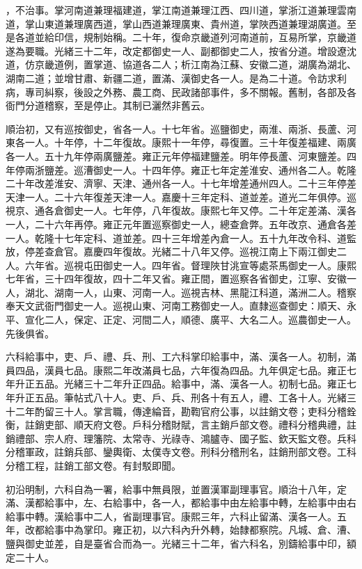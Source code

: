 \begin{pinyinscope}
，不治事。掌河南道兼理福建道，掌江南道兼理江西、四川道，掌浙江道兼理雲南道，掌山東道兼理廣西道，掌山西道兼理廣東、貴州道，掌陜西道兼理湖廣道。至是各道並給印信，規制始稱。二十年，復命京畿道列河南道前，互易所掌，京畿道遂為要職。光緒三十二年，改定都御史一人、副都御史二人，按省分道。增設遼沈道，仿京畿道例，置掌道、協道各二人；析江南為江蘇、安徽二道，湖廣為湖北、湖南二道；並增甘肅、新疆二道，置滿、漢御史各一人。是為二十道。令訪求利病，專司糾察，後設之外務、農工商、民政諸部事件，多不關報。舊制，各部及各衙門分道稽察，至是停止。其制已灑然非舊云。

順治初，又有巡按御史，省各一人。十七年省。巡鹽御史，兩淮、兩浙、長蘆、河東各一人。十年停，十二年復故。康熙十一年停，尋復置。三十年復差福建、兩廣各一人。五十九年停兩廣鹽差。雍正元年停福建鹽差。明年停長蘆、河東鹽差。四年停兩浙鹽差。巡漕御史一人。十四年停。雍正七年定差淮安、通州各二人。乾隆二十年改差淮安、濟寧、天津、通州各一人。十七年增差通州四人。二十三年停差天津一人。二十六年復差天津一人。嘉慶十三年定科、道並差。道光二年俱停。巡視京、通各倉御史一人。七年停，八年復故。康熙七年又停。二十年定差滿、漢各一人，二十六年再停。雍正元年置巡察御史一人，總查倉弊。五年改京、通倉各差一人。乾隆十七年定科、道並差。四十三年增差內倉一人。五十九年改令科、道監放，停差查倉官。嘉慶四年復故。光緒二十八年又停。巡視江南上下兩江御史二人。六年省。巡視屯田御史一人。四年省。督理陜甘洮宣等處茶馬御史一人。康熙七年省，三十四年復故，四十二年又省。雍正間，置巡察各省御史，江寧、安徽一人，湖北、湖南一人，山東、河南一人。巡視吉林、黑龍江科道，滿洲二人。稽察奉天文武衙門御史一人。巡視山東、河南工務御史一人。直隸巡查御史：順天、永平、宣化二人，保定、正定、河間二人，順德、廣平、大名二人。巡農御史一人。先後俱省。

六科給事中，吏、戶、禮、兵、刑、工六科掌印給事中，滿、漢各一人。初制，滿員四品，漢員七品。康熙二年改滿員七品，六年復為四品。九年俱定七品。雍正七年升正五品。光緒三十二年升正四品。給事中，滿、漢各一人。初制七品。雍正七年升正五品。筆帖式八十人。吏、戶、兵、刑各十有五人，禮、工各十人。光緒三十二年酌留三十人。掌言職，傳達綸音，勘鞫官府公事，以註銷文卷；吏科分稽銓衡，註銷吏部、順天府文卷。戶科分稽財賦，言主銷戶部文卷。禮科分稽典禮，註銷禮部、宗人府、理籓院、太常寺、光祿寺、鴻臚寺、國子監、欽天監文卷。兵科分稽軍政，註銷兵部、鑾輿衛、太僕寺文卷。刑科分稽刑名，註銷刑部文卷。工科分稽工程，註銷工部文卷。有封駁即聞。

初沿明制，六科自為一署，給事中無員限，並置漢軍副理事官。順治十八年，定滿、漢都給事中，左、右給事中，各一人，都給事中由左給事中轉，左給事中由右給事中轉。漢給事中二人，省副理事官。康熙三年，六科止留滿、漢各一人。五年，改都給事中為掌印。雍正初，以六科內升外轉，始隸都察院。凡城、倉、漕、鹽與御史並差，自是臺省合而為一。光緒三十二年，省六科名，別鑄給事中印，額定二十人。


\end{pinyinscope}
